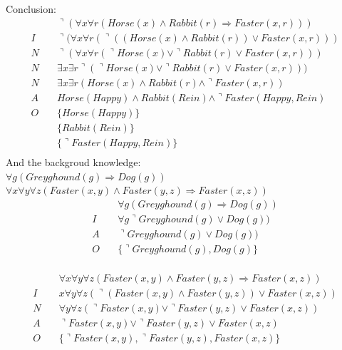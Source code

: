 \documentclass[letterpaper, 12pt]{artikel3}
\begin{document}
Conclusion:\\
\begin{align*}
&\urcorner (\forall x  \forall r  (Horse(x) \land Rabbit(r) \Rightarrow  Faster(x,r)))\\
I \quad & \urcorner (\forall x  \forall r  (\urcorner ((Horse(x) \land Rabbit(r)) \lor Faster(x,r)))\\
N \quad & \urcorner (\forall x  \forall r ( \urcorner Horse(x) \lor \urcorner Rabbit(r) \lor Faster(x,r)))\\
N \quad & \exists x \exists r \urcorner ( \urcorner Horse(x) \lor \urcorner Rabbit(r) \lor Faster(x,r)))\\
N \quad & \exists x \exists r (Horse(x) \land  Rabbit(r) \land \urcorner Faster(x,r)) \\
A \quad & Horse(Happy) \land  Rabbit(Rein) \land \urcorner Faster(Happy,Rein)\\
O \quad & \{Horse(Happy)\} \\
\quad & \{Rabbit(Rein)\}\\
\quad & \{\urcorner Faster(Happy,Rein)\}\\
\end{align*}
And the backgroud knowledge:\\
$\forall g (Greyghound(g) \Rightarrow Dog(g))$\\
$\forall x \forall y \forall z(Faster(x,y) \land Faster(y,z) \Rightarrow Faster(x,z))$\\

\begin{align*}
& \forall g (Greyghound(g) \Rightarrow Dog(g))\\
I \quad & \forall g \urcorner Greyghound(g) \lor Dog(g)) \\
A \quad & \urcorner Greyghound(g) \lor Dog(g)) \\
O \quad & \{ \urcorner Greyghound(g), Dog(g) \}\\
\end{align*}

\begin{align*}
&\forall x \forall y \forall z (Faster(x,y) \land Faster(y,z) \Rightarrow Faster(x,z))\\
I \quad & x \forall y \forall z( \urcorner (Faster(x,y) \land Faster(y,z) ) \lor Faster(x,z) ) \\ 
N \quad & \forall y \forall z (\urcorner Faster(x,y) \lor \urcorner Faster(y,z)  \lor Faster(x,z) ) \\ 
A \quad & \urcorner Faster(x,y) \lor \urcorner Faster(y,z)  \lor Faster(x,z)\\
O \quad & \{ \urcorner Faster(x,y), \urcorner Faster(y,z), Faster(x,z) \}\\
\end{align*}
\end{document}
